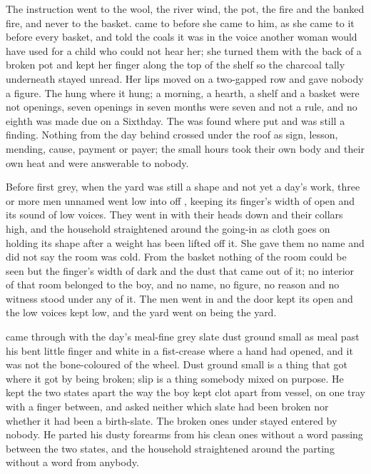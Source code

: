 The instruction went to the wool, the river wind, the pot, the fire and the banked fire, and never to the basket.  came to  before she came to him, as she came to it before every basket, and told the coals it was  in the voice another woman would have used for a child who could not hear her; she turned them with the back of a broken pot and kept her finger along the top of the shelf so the charcoal tally underneath stayed unread. Her lips moved on a two-gapped row and gave nobody a figure. The  hung where it hung; a morning, a hearth, a shelf and a basket were not openings, seven openings in seven months were seven and not a rule, and no eighth was made due on a Sixthday. The  was found where put and was still a finding. Nothing from the day behind crossed under the roof as sign, lesson, mending, cause, payment or payer; the small hours took their own body and their own heat and were answerable to nobody.

Before first grey, when the yard was still a shape and not yet a day's work, three or more men unnamed went low into  off , keeping its finger's width of open and its sound of low voices. They went in with their heads down and their collars high, and the household straightened around the going-in as cloth goes on holding its shape after a weight has been lifted off it. She gave them no name and did not say the room was cold. From the basket nothing of the room could be seen but the finger's width of dark and the dust that came out of it; no interior of that room belonged to the boy, and no name, no figure, no reason and no witness stood under any of it. The men went in and the door kept its open and the low voices kept low, and the yard went on being the yard.

 came through  with the day's meal-fine grey slate dust ground small as meal past his bent little finger and white in a fist-crease where a hand had opened, and it was not the bone-coloured  of the wheel. Dust ground small is a thing that got where it got by being broken; slip is a thing somebody mixed on purpose. He kept the two states apart the way the boy kept clot apart from vessel, on one tray with a finger between, and asked neither which slate had been broken nor whether it had been a birth-slate. The broken ones under  stayed entered by nobody. He parted his dusty forearms from his clean ones without a word passing between the two states, and the household straightened around the parting without a word from anybody.


